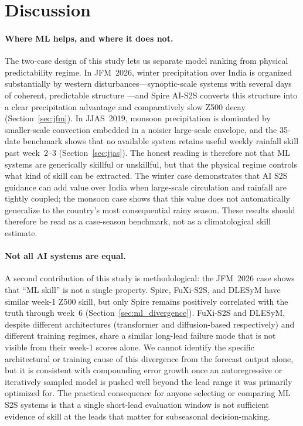 \documentclass[11pt,a4paper]{article}
\begin{document}
\section{Discussion}\label{sec:discussion}

\paragraph{Where ML helps, and where it does not.}
The two-case design of this study lets us separate model ranking from physical
predictability regime. In JFM~2026, winter precipitation over India is
organized substantially by western disturbances---synoptic-scale systems with
several days of coherent, predictable structure
\citep{dimri2015,hunt2018}---and Spire AI-S2S converts this structure into a
clear precipitation advantage and comparatively slow Z500 decay
(Section~\ref{sec:jfm}). In JJAS~2019, monsoon precipitation is dominated by
smaller-scale convection embedded in a noisier large-scale envelope, and the
35-date benchmark shows that no available system retains useful weekly
rainfall skill past week~2--3 (Section~\ref{sec:jjas}). The honest reading is
therefore not that ML systems are generically skillful or unskillful, but that
the physical regime controls what kind of skill can be extracted. The winter
case demonstrates that AI S2S guidance can add value over India when
large-scale circulation and rainfall are tightly coupled; the monsoon case
shows that this value does not automatically generalize to the country's most
consequential rainy season. These results should therefore be read as a
case-season benchmark, not as a climatological skill estimate.

\paragraph{Not all AI systems are equal.}
A second contribution of this study is methodological: the JFM~2026 case shows
that ``ML skill'' is not a single property. Spire, FuXi-S2S, and DLESyM have
similar week-1 Z500 skill, but only Spire remains positively correlated with
the truth through week~6 (Section~\ref{sec:ml_divergence}). FuXi-S2S and
DLESyM, despite different architectures (transformer and diffusion-based
respectively) and different training regimes, share a similar long-lead failure
mode that is not visible from their week-1 scores alone. We cannot identify the
specific architectural or training cause of this divergence from the forecast
output alone, but it is consistent with compounding error growth once an
autoregressive or iteratively sampled model is pushed well beyond the lead
range it was primarily optimized for. The practical consequence for anyone
selecting or comparing ML S2S systems is that a single short-lead evaluation
window is not sufficient evidence of skill at the leads that matter for
subseasonal decision-making.
\end{document}
